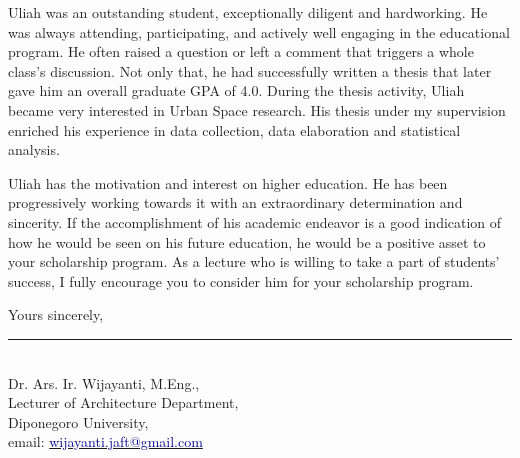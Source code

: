 \documentclass[12pt,a4paper]{lor}
\begin{document}
Uliah was an outstanding student, exceptionally diligent and hardworking.
He was always attending, participating, and actively well engaging in the educational program.
He often raised a question or left a comment that triggers a whole class's discussion.
Not only that, he had successfully written a thesis that later gave him an overall graduate GPA of 4.0.
During the thesis activity, Uliah became very interested in Urban Space research.
His thesis under my supervision enriched his experience in data collection, data elaboration and statistical analysis.

Uliah has the motivation and interest on higher education.
He has been progressively working towards it with an extraordinary determination and sincerity.
If the accomplishment of his academic endeavor is a good indication of how he would be seen on his future education, he would be a positive asset to your scholarship program. %
As a lecture who is willing to take a part of students' success, I fully encourage you to consider him for your scholarship program.


Yours sincerely,
\begin{spacing}{1}

\vspace{5em}
\rule{5cm}{1pt} \\%
Dr. Ars. Ir. Wijayanti, M.Eng.,\\
Lecturer of Architecture Department,\\
Diponegoro University,\\
email: \href{mailto:wijayanti.jaft@gmail.com}{\textcolor{darkblue}{wijayanti.jaft@gmail.com}}
\end{spacing}



\end{document}
